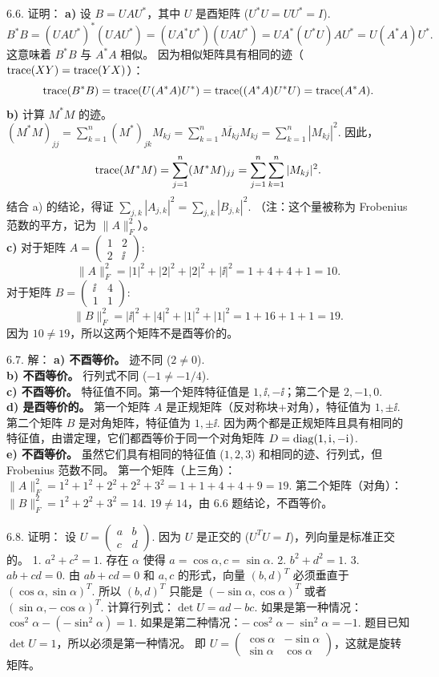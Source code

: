 \begin{exer}
6.6. 证明：
\textbf{a)} 设 $B = U A U^*$，其中 $U$ 是酉矩阵 ($U^*U = UU^* = I$).
$$ B^* B = (U A U^*)^* (U A U^*) = (U A^* U^*) (U A U^*) = U A^* (U^* U) A U^* = U (A^* A) U^*. $$
这意味着 $B^*B$ 与 $A^*A$ 相似。
因为相似矩阵具有相同的迹（$\operatorname{trace}(XY) = \operatorname{trace}(YX)$）：
$$ \operatorname{trace}(B^*B) = \operatorname{trace}(U (A^* A) U^*) = \operatorname{trace}((A^* A) U^* U) = \operatorname{trace}(A^* A). $$
\textbf{b)} 计算 $M^*M$ 的迹。
$(M^*M)_{jj} = \sum_{k=1}^n (M^*)_{jk} M_{kj} = \sum_{k=1}^n \overline{M_{kj}} M_{kj} = \sum_{k=1}^n |M_{kj}|^2$.
因此，
$$ \operatorname{trace}(M^*M) = \sum_{j=1}^n (M^*M)_{jj} = \sum_{j=1}^n \sum_{k=1}^n |M_{kj}|^2. $$
结合 a) 的结论，得证 $\sum_{j,k} |A_{j,k}|^2 = \sum_{j,k} |B_{j,k}|^2$.
（注：这个量被称为 Frobenius 范数的平方，记为 $\|A\|_F^2$）。
\\
\textbf{c)}
对于矩阵 $A = \begin{pmatrix} 1 & 2 \\ 2 & \ii \end{pmatrix}$:
$$ \|A\|_F^2 = |1|^2 + |2|^2 + |2|^2 + |\ii|^2 = 1 + 4 + 4 + 1 = 10. $$
对于矩阵 $B = \begin{pmatrix} \ii & 4 \\ 1 & 1 \end{pmatrix}$:
$$ \|B\|_F^2 = |\ii|^2 + |4|^2 + |1|^2 + |1|^2 = 1 + 16 + 1 + 1 = 19. $$
因为 $10 \neq 19$，所以这两个矩阵不是酉等价的。

6.7. 解：
\textbf{a) 不酉等价。} 迹不同 ($2 \neq 0$).\\
\textbf{b) 不酉等价。} 行列式不同 ($-1 \neq -1/4$).\\
\textbf{c) 不酉等价。} 特征值不同。第一个矩阵特征值是 $1, \ii, -\ii$；第二个是 $2, -1, 0$.\\
\textbf{d) 是酉等价的。}
第一个矩阵 $A$ 是正规矩阵（反对称块+对角），特征值为 $1, \pm\ii$.
第二个矩阵 $B$ 是对角矩阵，特征值为 $1, \pm\ii$.
因为两个都是正规矩阵且具有相同的特征值，由谱定理，它们都酉等价于同一个对角矩阵 $D = \operatorname{diag}(1, \mathrm{i}\mkern1mu, -\mathrm{i}\mkern1mu)$.
\\
\textbf{e) 不酉等价。}
虽然它们具有相同的特征值 ($1, 2, 3$) 和相同的迹、行列式，但 Frobenius 范数不同。
第一个矩阵（上三角）：$\|A\|_F^2 = 1^2+1^2+2^2+2^2+3^2 = 1+1+4+4+9 = 19$.
第二个矩阵（对角）：$\|B\|_F^2 = 1^2+2^2+3^2 = 14$.
$19 \neq 14$，由 6.6 题结论，不酉等价。

6.8. 证明：
设 $U = \begin{pmatrix} a & b \\ c & d \end{pmatrix}$.
因为 $U$ 是正交的 ($U^T U = I$)，列向量是标准正交的。
1. $a^2 + c^2 = 1$. 存在 $\alpha$ 使得 $a = \cos \alpha, c = \sin \alpha$.
2. $b^2 + d^2 = 1$.
3. $ab + cd = 0$.
由 $ab+cd=0$ 和 $a,c$ 的形式，向量 $(b, d)^T$ 必须垂直于 $(\cos \alpha, \sin \alpha)^T$.
所以 $(b, d)^T$ 只能是 $(-\sin \alpha, \cos \alpha)^T$ 或者 $(\sin \alpha, -\cos \alpha)^T$.
计算行列式：$\det U = ad - bc$.
如果是第一种情况：$\cos^2 \alpha - (-\sin^2 \alpha) = 1$.
如果是第二种情况：$-\cos^2 \alpha - \sin^2 \alpha = -1$.
题目已知 $\det U = 1$，所以必须是第一种情况。
即 $U = \begin{pmatrix} \cos \alpha & -\sin \alpha \\ \sin \alpha & \cos \alpha \end{pmatrix}$，这就是旋转矩阵。


\end{exer}
